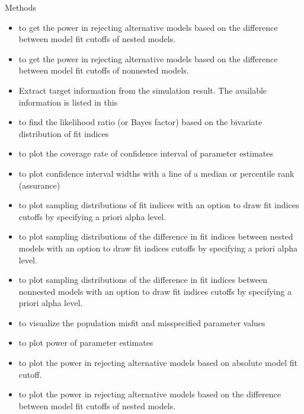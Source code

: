 \documentclass[a4paper]{book}
\begin{document}
\begin{Section}{Methods}
\begin{itemize}
\item {} to get the power in rejecting alternative models based on the difference between model fit cutoffs of nested models. 
\item {} to get the power in rejecting alternative models based on the difference between model fit cutoffs of nonnested models.  
\item {} Extract target information from the simulation result. The available information is listed in this 
\item {} to find the likelihood ratio (or Bayes factor) based on the bivariate distribution of fit indices
\item {} to plot the coverage rate of confidence interval of parameter estimates
\item {} to plot confidence interval widths with a line of a median or percentile rank (assurance) 
\item {} to plot sampling distributions of fit indices with an option to draw fit indices cutoffs by specifying a priori alpha level.
\item {} to plot sampling distributions of the difference in fit indices between nested models with an option to draw fit indices cutoffs by specifying a priori alpha level.
\item {} to plot sampling distributions of the difference in fit indices between nonnested models with an option to draw fit indices cutoffs by specifying a priori alpha level.
\item {} to visualize the population misfit and misspecified parameter values
\item {} to plot power of parameter estimates 
\item {} to plot the power in rejecting alternative models based on absolute model fit cutoff.
\item {} to plot the power in rejecting alternative models based on the difference between model fit cutoffs of nested models. 

\end{itemize}
\end{Section}
\end{document}
